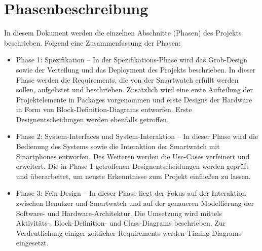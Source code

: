 \section{Phasenbeschreibung}
In diesem Dokument werden die einzelnen Abschnitte (Phasen) des Projekts beschrieben. Folgend eine Zusammenfassung der Phasen:
\begin{itemize}
  \item Phase 1: Spezifikation -- In der Spezifikations-Phase wird das Grob-Design sowie der Verteilung und das Deployment des Projekts beschrieben. In dieser Phase werden die \glspl{Requirement}, die von der Smartwatch erfüllt werden sollen, aufgelistet und beschrieben. Zusätzlich wird eine erste Aufteilung der Projektelemente in \glspl{Package} vorgenommen und erste Designs der Hardware in Form von Block-Definition-Diagrams entworfen. Erste Designentscheidungen werden ebenfalls getroffen.

  \item Phase 2: System-Interfaces und System-Interaktion -- In dieser Phase wird die Bedienung des Systems sowie die Interaktion der Smartwatch mit Smartphones entworfen. Des Weiteren werden die \glspl{Use-Case} verfeinert und erweitert. Die in Phase 1 getroffenen Designentscheidungen werden geprüft und überarbeitet, um neuste Erkenntnisse zum Projekt einfließen zu lassen.

  \item Phase 3: Fein-Design -- In dieser Phase liegt der Fokus auf der Interaktion zwischen Benutzer und Smartwatch und auf der genaueren Modellierung der Software- und Hardware-Architektur. Die Umsetzung wird mittels Aktivitäts-, Block-Definition- und Class-Diagrams beschrieben. Zur Verdeutlichung einiger zeitlicher Requirements werden Timing-Diagrams eingesetzt.
\end{itemize}
